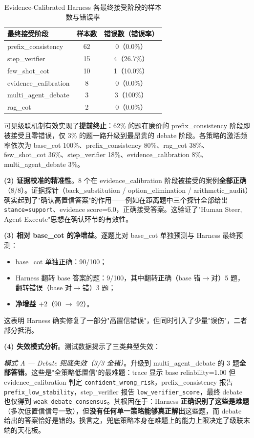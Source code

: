 \documentclass[lang=cn,a4paper,newtx]{elegantpaper}
\begin{document}
\begin{table}[htbp]
\centering
\caption{Evidence-Calibrated Harness 各最终接受阶段的样本数与错误率}
\label{tab:ech-stage}
\begin{tabular}{lcc}
\toprule
最终接受阶段 & 样本数 & 错误数（错误率） \\
\midrule
prefix\_consistency & 62 & 0（0.0\%） \\
step\_verifier & 15 & 4（26.7\%） \\
few\_shot\_cot & 10 & 1（10.0\%） \\
evidence\_calibration & 8 & 0（0.0\%） \\
multi\_agent\_debate & 3 & 3（100\%） \\
rag\_cot & 2 & 0（0.0\%） \\
\bottomrule
\end{tabular}
\end{table}

可见级联机制有效实现了\textbf{提前终止}：62\% 的题在廉价的 prefix\_consistency 阶段即被接受且零错误，仅 3\% 的题一路升级到最昂贵的 debate 阶段。各策略的激活频率依次为 base\_cot 100\%、prefix\_consistency 80\%、rag\_cot 38\%、few\_shot\_cot 36\%、step\_verifier 18\%、evidence\_calibration 8\%、multi\_agent\_debate 3\%。

\textbf{(2) 证据校准的精准性}。8 个在 evidence\_calibration 阶段被接受的案例\textbf{全部正确}（8/8）。证据探针（back\_substitution / option\_elimination / arithmetic\_audit）确实起到了"确认高置信答案"的作用——例如在距离题中三个探针全部给出 \texttt{stance=support}、evidence score=6.0，正确接受答案。这验证了"Human Steer, Agent Execute"思想在确认环节的有效性。

\textbf{(3) 相对 base\_cot 的净增益}。逐题比对 base\_cot 单独预测与 Harness 最终预测：

\begin{itemize}
  \item base\_cot 单独正确：90/100；
  \item Harness 翻转 base 答案的题：9/100，其中翻转正确（base 错$\to$对）5 题，翻转错误（base 对$\to$错）3 题；
  \item \textbf{净增益 $+2$}（90 $\to$ 92）。
\end{itemize}

这表明 Harness 确实修复了一部分"高置信错误"，但同时引入了少量"误伤"，二者部分抵消。

\textbf{(4) 失效模式分析}。测试数据揭示了三类典型失效：

\textit{模式 A — Debate 兜底失效（3/3 全错）}。升级到 multi\_agent\_debate 的 3 题\textbf{全部答错}。这些是"全策略低置信"的最难题：trace 显示 base reliability=1.00 但 evidence\_calibration 判定 \texttt{confident\_wrong\_risk}，prefix\_consistency 报告 \texttt{prefix\_low\_stability}，step\_verifier 报告 \texttt{low\_verifier\_score}，最终 debate 也仅得到 \texttt{weak\_debate\_consensus}。其根因在于：Harness \textbf{正确识别了这些是难题}（多次低置信信号一致），但\textbf{没有任何单一策略能够真正解出}这些题，而 debate 给出的答案恰好是错的。换言之，兜底策略本身在难题上的能力上限决定了级联末端的天花板。
\end{document}
